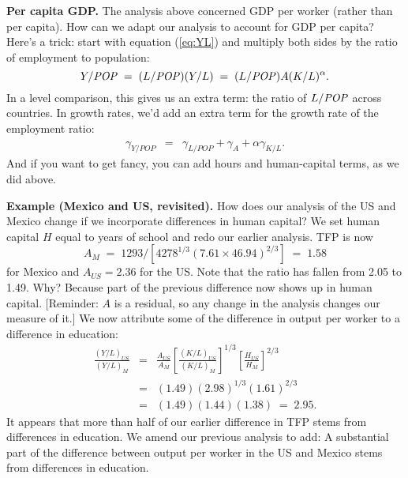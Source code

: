 \textbf{Per capita GDP. } The analysis above concerned GDP per worker (rather than per capita).
How can we adapt our analysis to account for GDP per capita?
Here's a trick:
start with equation (\ref{eq:YL}) and multiply both sides by
the ratio of employment to population:
\[
    Y/\mbox{\em POP\/} \;=\; (L/\mbox{\em POP\/}) (Y/L) \;=\; (L/\mbox{\em POP\/}) A (K/L)^\alpha .
\]
In a level comparison, this gives us an extra term:  the ratio
of $L/\mbox{\em POP\/}$ across countries.
In growth rates, we'd add an extra term for the growth rate of
the employment ratio:
\begin{eqnarray*}
    \gamma_{Y/POP} &=&  \gamma_{L/POP}  + \gamma_A
                + \alpha \gamma_{K/L}  .
\end{eqnarray*}
And if you want to get fancy, you can add hours and human-capital terms,
as we did above.


\textbf{Example (Mexico and US, revisited).}
How does our analysis of the US and Mexico change if
we incorporate differences in human capital?
We set human capital $H$ equal to years of school
and redo our earlier analysis.
TFP is now
\[
    A_M \;=\; 1293 / [ 4278^{1/3} (7.61 \times 46.94)^{2/3} ] \;=\; 1.58
\]
for Mexico and $A_{US} = 2.36$ for the US.
Note that the ratio has fallen from 2.05 to 1.49.
Why?  Because part of the previous difference
now shows up in human capital.
[Reminder:  $A$ is a residual, so
any change in the analysis changes our measure of it.]
We now attribute some of the difference in output per worker
to a difference in education:
\begin{eqnarray*}
     \frac{(Y/L)_{US}}{(Y/L)_{M}}  &=&  \frac{A_{US}}{A_M}
                        \left[ \frac{(K/L)_{US}}{(K/L)_{M}} \right]^{1/3}
                        \left[ \frac{H_{US}}{H_M} \right]^{2/3}_{\phantom{X_X}}   \\
                         &=&   (1.49) (2.98)^{1/3} (1.61)^{2/3}  \\%
                         &=&   (1.49) (1.44) (1.38) \;=\; 2.95 . %
\end{eqnarray*}
It appears that more than half of our earlier difference in TFP
stems from differences in education.
We amend our previous analysis to add:
A substantial part of the difference between output per worker
in the US and Mexico stems from differences in education.

